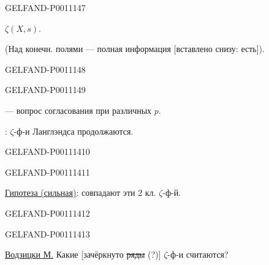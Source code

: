 \begin{GelfandAdjacentEvidence}{GELFAND-P001114}{7}


 $\zeta(X,s)$.

(Над конечн. полями — полная информация [вставлено снизу: есть]).
\end{GelfandAdjacentEvidence}
\begin{GelfandAdjacentEvidence}{GELFAND-P001114}{8}


\end{GelfandAdjacentEvidence}
\begin{GelfandAdjacentEvidence}{GELFAND-P001114}{9}

— вопрос согласования при различных $p$.

: $\zeta$-ф-и Ланглэндса продолжаются.

\end{GelfandAdjacentEvidence}
\begin{GelfandAdjacentEvidence}{GELFAND-P001114}{10}

\end{GelfandAdjacentEvidence}
\begin{GelfandAdjacentEvidence}{GELFAND-P001114}{11}

\underline{Гипотеза (сильная)}: совпадают эти 2 кл. $\zeta$-ф-й.

\end{GelfandAdjacentEvidence}
\begin{GelfandAdjacentEvidence}{GELFAND-P001114}{12}

\end{GelfandAdjacentEvidence}
\begin{GelfandAdjacentEvidence}{GELFAND-P001114}{13}


\underline{Водзицки М.} Какие [зачёркнуто \sout{ряды} (?)] $\zeta$-ф-и считаются?
\end{GelfandAdjacentEvidence}
